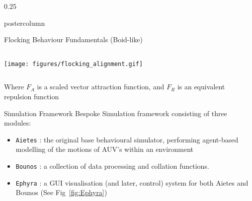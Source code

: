 \documentclass[final,hyperref={pdfpagelabels=false}]{beamer}
\def\colwidth{0.25\linewidth}
\begin{document}
\begin{frame}[fragile]
\begin{columns}[t]
\begin{column}{\colwidth}
\begin{beamercolorbox}[center,wd=\textwidth]{postercolumn}
\begin{minipage}[T]{.98\textwidth}
{\begin{block}{Flocking Behaviour Fundamentals (Boid-like)}
\begin{columns}[T]
\begin{column}{.25\textwidth}
                  \vspace{\baselineskip}
                  \texttt{[image: figures/flocking\_alignment.gif]}
                \end{column}
              \end{columns}
              \vspace{\baselineskip}
              Where $F_A$ is a scaled vector attraction function, and $F_R$ is an equivalent repulsion function
            \end{block}
\fi
            \begin{block}{Simulation Framework}
              Bespoke Simulation framework consisting of three modules:
              \begin{itemize}
                \item \texttt{Aietes} : the original base behavioural simulator, performing agent-based modelling of the motions of AUV's within an 
                  environment
                \item \texttt{Bounos} : a collection of data processing and collation functions.
                \item \texttt{Ephyra} : a GUI visualisation (and later, control) system for both Aietes and Bounos (See Fig~\ref{fig:Ephyra})
              \end{itemize}

              \vspace{0.5\baselineskip}


\end{block}}
\end{minipage}
\end{beamercolorbox}
\end{column}
\end{columns}
\end{frame}
\end{document}
